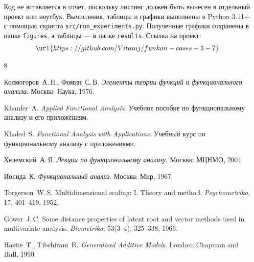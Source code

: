 \documentclass[12pt,a4paper]{article}
\newcommand{\CodeRepository}{\url{https://github.com/Vitamj/funkan-cases-3-7}}
\begin{document}
Код не вставляется в отчет, поскольку листинг должен быть вынесен в отдельный
проект или ноутбук. Вычисления, таблицы и графики выполнены в Python 3.11+
с помощью скрипта \texttt{src/run\_experiments.py}. Полученные графики
сохранены в папке \texttt{figures}, а таблицы --- в папке \texttt{results}.
Ссылка на проект:
\[
    \CodeRepository
\]

\begin{thebibliography}{8}
\begingroup
\RaggedRight

Колмогоров~А.\,Н., Фомин~С.\,В.
\textit{Элементы теории функций и функционального анализа}.
Москва: Наука, 1976.

Khanfer~A.
\textit{Applied Functional Analysis}.
Учебное пособие по функциональному анализу и его приложениям.

Khaled~S.
\textit{Functional Analysis with Applications}.
Учебный курс по функциональному анализу с приложениями.

Хелемский~А.\,Я.
\textit{Лекции по функциональному анализу}.
Москва: МЦНМО, 2004.

Иосида~К.
\textit{Функциональный анализ}.
Москва: Мир, 1967.

Torgerson~W.\,S.
Multidimensional scaling: I. Theory and method.
\textit{Psychometrika}, 17, 401--419, 1952.

Gower~J.\,C.
Some distance properties of latent root and vector methods used in multivariate analysis.
\textit{Biometrika}, 53(3--4), 325--338, 1966.

Hastie~T., Tibshirani~R.
\textit{Generalized Additive Models}.
London: Chapman and Hall, 1990.

\endgroup
\end{thebibliography}
\end{document}
